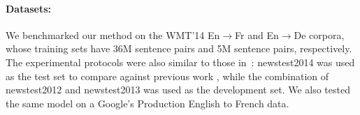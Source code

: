 \documentclass{article} %
\begin{document}
\paragraph{Datasets:} We benchmarked our method on the WMT'14 En$\rightarrow$Fr and En$\rightarrow$De corpora, whose training sets have 36M sentence pairs and 5M sentence pairs, respectively. The experimental protocols were also similar to those in~\citep{GNMT}: newstest2014 was used as the test set to compare against previous work \citep{LuongPM:2015:EAANMT,Zhou:2016:DeppAtt,GNMT}, while the combination of newstest2012 and newstest2013 was used as the development set.  We also tested the same model on a Google's Production English to French data.


\begin{table}[h!]
\caption{Results on WMT'14 En$\rightarrow$ Fr newstest2014 (bold values represent best results).}
\label{tab:wmtenfr}
\begin{center}
\setlength\tabcolsep{2pt}
\vspace{-5pt}
\end{center}
\end{table}
\end{document}
